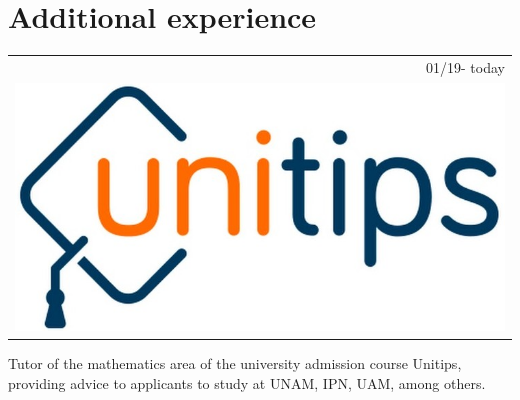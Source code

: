 \documentclass[]{friggeri-cv}
\begin{document}
\section{Additional experience}
\begin{entrylist}
\entry
    {   \begin{tabular}{r}
    		01/19- today \\
     		\includegraphics[scale=0.09]{img/unitips.jpg}
	\end{tabular}
    }
    {\vspace{-1.05cm}}
    { }
    {Tutor of the mathematics area of the university admission course Unitips, providing advice to applicants to study at UNAM, IPN, UAM, among others.}


\end{entrylist}
\end{document}
